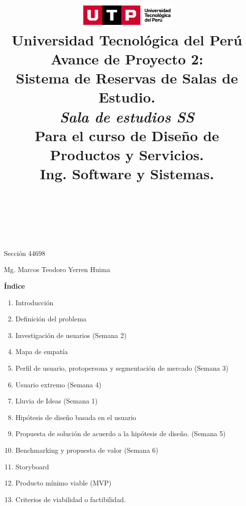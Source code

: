 \documentclass{article}
\title{
  \includegraphics[width=5cm]{./assets/logo-utp.png} \\
  \vspace{1cm}
  \textbf{Universidad Tecnológica del Perú} \\
  \vspace{2cm}
  \textbf{Avance de Proyecto 2:\\Sistema de Reservas de Salas de Estudio.\\\textit{Sala de estudios SS}} \\
  \vspace{1cm}
  \large \textbf{Para el curso de Diseño de Productos y Servicios.} \\
  \large \textbf{Ing. Software y Sistemas.}
}
\author{
  \text{Luis Huatay Salcedo.} \\
  \text{Garcia Chumpitaz Cindel Roxell.} \\
  \text{Díaz Benítez, Fernando Raúl.} \\
  \text{Quispe Fernandez, Bryan Alexander.}
}
\begin{document}
\maketitle
\begin{center}
  Sección 44698
\end{center}
\thispagestyle{empty}
\begin{center}
  Mg. Marcos Teodoro Yerren Huima  
\end{center}
\restoregeometry

\newpage
\begin{center}
  \textbf{\Large Índice}
\end{center}
\vspace{0.5cm} %
\begin{spacing}{1.15} %
  \noindent
  \begin{enumerate}
    \item Introducción
    \item Definición del problema
    \item Investigación de usuarios (Semana 2)
    \item Mapa de empatía
    \item Perfil de usuario, protopersona y segmentación de mercado (Semana 3)
    \item Usuario extremo (Semana 4)
    \item Lluvia de Ideas (Semana 1)
    \item Hipótesis de diseño basada en el usuario
    \item Propuesta de solución de acuerdo a la hipótesis de diseño. (Semana 5)
    \item Benchmarking y propuesta de valor (Semana 6)
    \item Storyboard
    \item Producto mínimo viable (MVP)
    \item Criterios de viabilidad o factibilidad.
    \end{enumerate}
\end{spacing}

\newpage
\vspace*{\fill}
\end{document}

